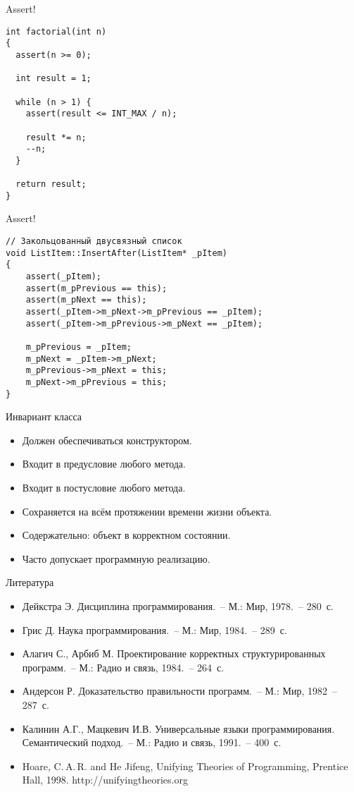 \documentclass[landscape]{slides}
\begin{document}
\begin{slide}
Assert!

\begin{verbatim}
int factorial(int n)
{
  assert(n >= 0);

  int result = 1;

  while (n > 1) {
    assert(result <= INT_MAX / n);

    result *= n;
    --n;
  }

  return result;
}
\end{verbatim}
\end{slide}

\begin{slide}
Assert!

\begin{verbatim}
// Закольцованный двусвязный список
void ListItem::InsertAfter(ListItem* _pItem)
{
    assert(_pItem);
    assert(m_pPrevious == this);
    assert(m_pNext == this);
    assert(_pItem->m_pNext->m_pPrevious == _pItem);
    assert(_pItem->m_pPrevious->m_pNext == _pItem);

    m_pPrevious = _pItem;
    m_pNext = _pItem->m_pNext;
    m_pPrevious->m_pNext = this;
    m_pNext->m_pPrevious = this;
}
\end{verbatim}
\end{slide}

\begin{slide}
Инвариант класса

\begin{itemize}
    \item Должен обеспечиваться конструктором.
    \item Входит в предусловие любого метода.
    \item Входит в постусловие любого метода.
    \item Сохраняется на всём протяжении времени жизни объекта.
    \item Содержательно: объект в корректном состоянии.
    \item Часто допускает программную реализацию.
\end{itemize}
\end{slide}

\begin{slide}
Литература
\begin{itemize}
\item Дейкстра Э. Дисциплина программирования.~-- М.: Мир, 1978.~-- 280~с.
\item Грис Д. Наука программирования.~-- М.: Мир, 1984.~-- 289~с.
\item Алагич С., Арбиб М. Проектирование корректных структурированных программ.~-- М.: Радио и связь, 1984.~-- 264~с.
\item Андерсон Р. Доказательство правильности программ.~-- М.: Мир, 1982~-- 287~с.
\item Калинин А.Г., Мацкевич И.В. Универсальные языки программирования. Семантический подход.~-- М.: Радио и связь, 1991.~-- 400~с.
\item Hoare, C.\,A.\,R. and He Jifeng, Unifying Theories of Programming, Prentice Hall, 1998. http://unifyingtheories.org
\end{itemize}
\end{slide}
\end{document}
